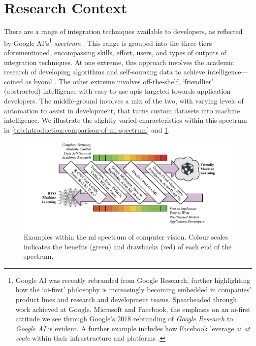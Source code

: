 \section{Research Context}
\label{sec:introduction:context}

There are a range of integration techniques available to developers, as reflected by Google AI's\footnote{
Google AI was recently rebranded from Google Research, further highlighting how the `\gls{ai}-first' philosophy is increasingly becoming embedded in companies' product lines and research and development teams. Spearheaded through work achieved at Google, Microsoft and Facebook, the emphasis on an \gls{ai}-first attitude we see through Google's 2018 rebranding of \textit{Google Research} to \textit{Google AI} \citep{Howard:2018tz} is evident. A further example includes how Facebook leverage \gls{ai} \textit{at scale} within their infrastructure and platforms \citep{Parekh:2017hx}.
} \textit{ spectrum} \citep{Ortiz:2017wg,LaForge:2018tm,McGowen:2019vt}. This range is grouped into the three tiers aforementioned, encompassing skills, effort, users, and types of outputs of integration techniques. At one extreme, this approach involves the academic research of developing algorithms and self-sourcing data to achieve intelligence---coined as \gls{byoml} \citep{Ortiz:2017wg,McGowen:2019vt,Jimerson:2017vh}. The other extreme involves off-the-shelf, `friendlier' (abstracted) intelligence with easy-to-use \glspl{api} targeted towards application developers. The middle-ground involves a mix of the two, with varying levels of automation to assist in development, that turns custom datasets into machine intelligence. 
We illustrate the slightly varied characteristics within this spectrum in \cref{tab:introduction:comparison-of-ml-spectrum} and \cref{fig:introduction:cv-spectrum}.


\begin{figure}[p]
\centering
\includegraphics[width=\linewidth]{cv-spectrum}
\caption[The spectrum of machine learning]{Examples within the \gls{ml} spectrum of computer vision. Colour scales indicates the benefits (green) and drawbacks (red) of each end of the spectrum.}
\label{fig:introduction:cv-spectrum}
\end{figure}

